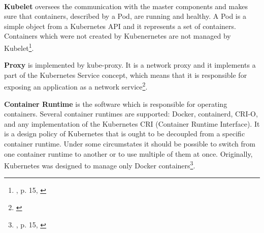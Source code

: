 \documentclass[12pt]{article}
\begin{document}
\paragraph{}
\textbf{Kubelet} oversees the communication with the master components and makes sure that containers, described by a Pod, are running and healthy. A Pod is a simple object from a Kubernetes API and it represents a set of containers. Containers which were not created by Kubenernetes are not managed by Kubelet\footnote{\cite{book-mastering-k8s}, p. 15, \cite{k8s-components}}.

\textbf{Proxy} is implemented by kube-proxy. It is a network proxy and it implements a part of the Kubernetes Service concept, which means that it is responsible for exposing an application as a network service\footnote{\cite{k8s-components}}.

\textbf{Container Runtime} is the software which is responsible for operating containers. Several container runtimes are supported: Docker, containerd, CRI-O, and any implementation of the Kubernetes CRI (Container Runtime Interface). It is a design policy of Kubernetes that is ought to be decoupled from a specific container runtime. Under some circumstates it should be possible to switch from one container runtime to another or to use multiple of them at once. Originally, Kubernetes was designed to manage only Docker containers\footnote{\cite{book-mastering-k8s}, p. 15, \cite{k8s-components}}.




\printbibliography
\end{document}
